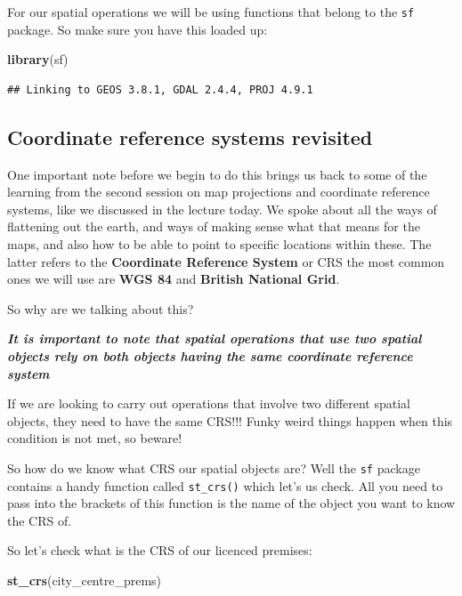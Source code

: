 \documentclass[]{book}
\newenvironment{Shaded}{\begin{snugshade}}{\end{snugshade}}
\newcommand{\KeywordTok}[1]{\textcolor[rgb]{0.13,0.29,0.53}{\textbf{#1}}}
\newcommand{\NormalTok}[1]{#1}
\begin{document}
For our spatial operations we will be using functions that belong to the \texttt{sf} package. So make sure you have this loaded up:

\begin{Shaded}
\begin{Highlighting}[]
\KeywordTok{library}\NormalTok{(sf)}
\end{Highlighting}
\end{Shaded}

\begin{verbatim}
## Linking to GEOS 3.8.1, GDAL 2.4.4, PROJ 4.9.1
\end{verbatim}

\hypertarget{coordinate-reference-systems-revisited}{%
\subsection{Coordinate reference systems revisited}\label{coordinate-reference-systems-revisited}}

One important note before we begin to do this brings us back to some of the learning from the second session on map projections and coordinate reference systems, like we discussed in the lecture today. We spoke about all the ways of flattening out the earth, and ways of making sense what that means for the maps, and also how to be able to point to specific locations within these. The latter refers to the \textbf{Coordinate Reference System} or CRS the most common ones we will use are \textbf{WGS 84} and \textbf{British National Grid}.

So why are we talking about this?

\textbf{\emph{It is important to note that spatial operations that use two spatial objects rely on both objects having the same coordinate reference system}}

If we are looking to carry out operations that involve two different spatial objects, they need to have the same CRS!!! Funky weird things happen when this condition is not met, so beware!

So how do we know what CRS our spatial objects are? Well the \texttt{sf} package contains a handy function called \texttt{st\_crs()} which let's us check. All you need to pass into the brackets of this function is the name of the object you want to know the CRS of.

So let's check what is the CRS of our licenced premises:

\begin{Shaded}
\begin{Highlighting}[]
\KeywordTok{st_crs}\NormalTok{(city_centre_prems)}
\end{Highlighting}
\end{Shaded}
\end{document}
